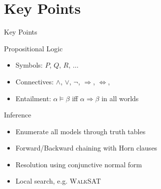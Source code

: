 \documentclass[14pt]{beamer}
\newcommand{\limpl}{\Rightarrow}
\newcommand{\liff}{\Leftrightarrow}
\begin{document}
\part{Key Points}
\begin{frame}{Key Points}
	\begin{block}{Propositional Logic}
		\begin{itemize}
			\item Symbols: $P$, $Q$, $R$, $\ldots$
			\item Connectives: $\land$, $\lor$, $\lnot$, $\limpl$, $\liff$, 
			\item Entailment: $\alpha \models \beta$ iff $\alpha \limpl \beta$ in all worlds
		\end{itemize}
	\end{block}
	\begin{block}{Inference}
		\begin{itemize}
			\item Enumerate all models through truth tables
			\item Forward/Backward chaining with Horn clauses
			\item Resolution using conjunctive normal form
			\item Local search, e.g. \textsc{WalkSAT}
		\end{itemize}
	\end{block}
\end{frame}
\end{document}
